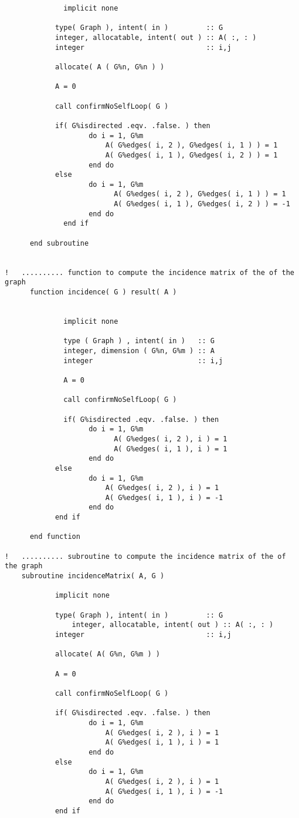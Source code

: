 \documentclass[10pt,a4paper,margin = 1.25cm]{article}
\begin{document}
\begin{lstlisting}
			  implicit none

  			type( Graph ), intent( in )         :: G   
  			integer, allocatable, intent( out ) :: A( :, : )
  			integer                             :: i,j
  
  			allocate( A ( G%n, G%n ) )

  			A = 0  

  			call confirmNoSelfLoop( G )
  
  			if( G%isdirected .eqv. .false. ) then
			    	do i = 1, G%m
		      			A( G%edges( i, 2 ), G%edges( i, 1 ) ) = 1
		      			A( G%edges( i, 1 ), G%edges( i, 2 ) ) = 1
    				end do
  			else
    				do i = 1, G%m
					      A( G%edges( i, 2 ), G%edges( i, 1 ) ) = 1
					      A( G%edges( i, 1 ), G%edges( i, 2 ) ) = -1
				    end do
			  end if
  
	  end subroutine  


!   .......... function to compute the incidence matrix of the of the graph
	  function incidence( G ) result( A )
	  
  
			  implicit none

			  type ( Graph ) , intent( in )   :: G
			  integer, dimension ( G%n, G%m ) :: A  
			  integer                         :: i,j
	
			  A = 0
  
			  call confirmNoSelfLoop( G )
			  
			  if( G%isdirected .eqv. .false. ) then
				    do i = 1, G%m
					      A( G%edges( i, 2 ), i ) = 1
					      A( G%edges( i, 1 ), i ) = 1
				    end do
  			else
    				do i = 1, G%m
   			   			A( G%edges( i, 2 ), i ) = 1
   			   			A( G%edges( i, 1 ), i ) = -1
   					end do
  			end if 
 
	  end function

!   .......... subroutine to compute the incidence matrix of the of the graph
  	subroutine incidenceMatrix( A, G )
  
  			implicit none

  			type( Graph ), intent( in )         :: G  
 				integer, allocatable, intent( out ) :: A( :, : )
  			integer                             :: i,j
  
  			allocate( A( G%n, G%m ) )

  			A = 0
  
  			call confirmNoSelfLoop( G )
 				
  			if( G%isdirected .eqv. .false. ) then
    				do i = 1, G%m
      					A( G%edges( i, 2 ), i ) = 1
      					A( G%edges( i, 1 ), i ) = 1
    				end do
  			else
    				do i = 1, G%m
      					A( G%edges( i, 2 ), i ) = 1
      					A( G%edges( i, 1 ), i ) = -1
    				end do
  			end if 
  

\end{lstlisting}
\end{document}
